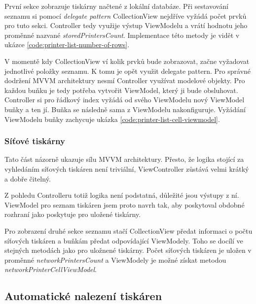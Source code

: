 První sekce zobrazuje tiskárny načtené z lokální databáze.
Při sestavování seznamu si pomocí \textit{delegate pattern} CollectionView nejdříve vyžádá počet prvků pro tuto sekci.
Controller tedy využije výstup ViewModelu a vrátí hodnotu jeho proměnné nazvané \textit{storedPrintersCount}.
Implementace této metody je vidět v ukázce \ref{code:printer-list-number-of-rows}.


V momentě kdy CollectionView ví kolik prvků bude zobrazovat, začne vyžadovat jednotlivé položky seznamu.
K tomu je opět využit delegate pattern.
Pro správné dodržení MVVM architektury nesmí Controller využívat modelové objekty.
Pro každou buňku je tedy potřeba vytvořit ViewModel, který ji bude obsluhovat.
Controller si pro řádkový index vyžádá od svého ViewModelu nový ViewModel buňky a ten jí.
Buňka se následně sama z ViewModelu nakonfiguruje.
Vyžádání ViewModelu buňky zachycuje ukázka \ref{code:printer-list-cell-viewmodel}.


\subsubsection*{Síťové tiskárny}

Tato část názorně ukazuje sílu MVVM architektury.
Přesto, že logika stojící za vyhledáním síťových tiskáren není triviální, ViewController zůstává velmi krátký a dobře čitelný.

Z pohledu Controlleru totiž logika není podstatná, důležité jsou výstupy z ní.
ViewModel pro seznam tiskáren jsem proto navrh tak, aby poskytoval obdobné rozhraní jako poskytuje pro uložené tiskárny.

Pro zobrazení druhé sekce seznamu stačí CollectionView předat informaci o počtu síťových tiskáren a buňkám předat odpovídající ViewModely.
Toho se docílí ve stejných metodách jako pro uložnené tiskárny.
Počet síťových tiskáren je uložen v proměnné \textit{networkPrintersCount} a ViewModely je možné získat metodou \textit{networkPrinterCellViewModel}.

\subsection{Automatické nalezení tiskáren}

